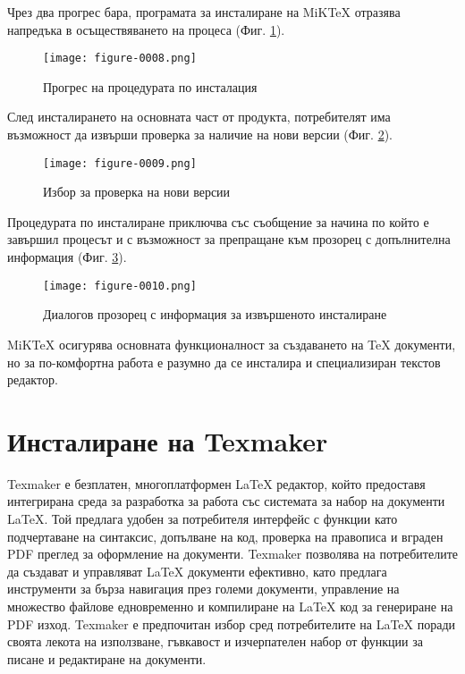 Чрез два прогрес бара, програмата за инсталиране на MiKTeX отразява напредъка в осъществяването на процеса (Фиг. \ref{figure-0008}).

\begin{figure}
  \centering
  \texttt{[image: figure-0008.png]}
  \caption{Прогрес на процедурата по инсталация}
\label{figure-0008}
\end{figure}

След инсталирането на основната част от продукта, потребителят има възможност да извърши проверка за наличие на нови версии (Фиг. \ref{figure-0009}).

\begin{figure}
  \centering
  \texttt{[image: figure-0009.png]}
  \caption{Избор за проверка на нови версии}
\label{figure-0009}
\end{figure}

Процедурата по инсталиране приключва със съобщение за начина по който е завършил процесът и с възможност за препращане към прозорец с допълнителна информация (Фиг. \ref{figure-0010}).

\begin{figure}
  \centering
  \texttt{[image: figure-0010.png]}
  \caption{Диалогов прозорец с информация за извършеното инсталиране}
\label{figure-0010}
\end{figure}

MiKTeX осигурява основната функционалност за създаването на TeX документи, но за по-комфортна работа е разумно да се инсталира и специализиран текстов редактор.

\section{Инсталиране на Texmaker}

Texmaker е безплатен, многоплатформен LaTeX редактор, който предоставя интегрирана среда за разработка за работа със системата за набор на документи LaTeX. Той предлага удобен за потребителя интерфейс с функции като подчертаване на синтаксис, допълване на код, проверка на правописа и вграден PDF преглед за оформление на документи. Texmaker позволява на потребителите да създават и управляват LaTeX документи ефективно, като предлага инструменти за бърза навигация през големи документи, управление на множество файлове едновременно и компилиране на LaTeX код за генериране на PDF изход. Texmaker е предпочитан избор сред потребителите на LaTeX поради своята лекота на използване, гъвкавост и изчерпателен набор от функции за писане и редактиране на документи.

